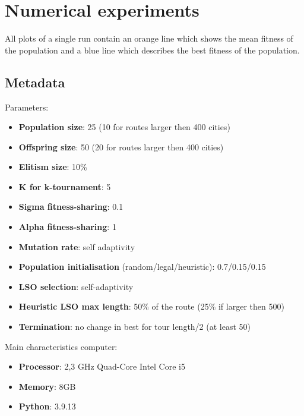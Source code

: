\documentclass[a4paper,10pt]{article}
\begin{document}
\section{Numerical experiments}

All plots of a single run contain an orange line which shows the mean fitness of the population and a blue line which describes the best fitness of the population.

\subsection{Metadata}
\label{params}
Parameters:
\begin{itemize}
	\item \textbf{Population size}: 25 (10 for routes larger then 400 cities)
	\item \textbf{Offspring size}: 50 (20 for routes larger then 400 cities)
	\item \textbf{Elitism size}: 10\%
	\item \textbf{K for k-tournament}: 5
	\item \textbf{Sigma fitness-sharing}: 0.1
	\item \textbf{Alpha fitness-sharing}: 1
	\item \textbf{Mutation rate}: self adaptivity
	\item \textbf{Population initialisation} (random/legal/heuristic): 0.7/0.15/0.15
	\item \textbf{LSO selection}: self-adaptivity
	\item \textbf{Heuristic LSO max length}: 50\% of the route (25\% if larger then 500)
	\item \textbf{Termination}: no change in best for tour length/2 (at least 50)
\end{itemize}
Main characteristics computer:
\begin{itemize}
	\item \textbf{Processor}: 2,3 GHz Quad-Core Intel Core i5
	\item \textbf{Memory}: 8GB
	\item \textbf{Python}: 3.9.13
\end{itemize}
\end{document}
